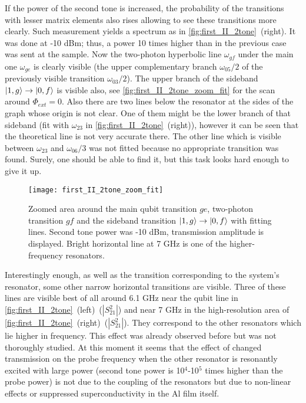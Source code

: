 \documentclass[12pt, twoside]{report}
\DeclarePairedDelimiter\ket{\lvert}{\rangle}
\numberwithin{equation}{section}
\begin{document}
If the power of the second tone is increased, the probability of the transitions with lesser matrix elements also rises allowing to see these transitions more clearly. Such measurement yields a spectrum as in \autoref{fig:first_II_2tone}~(right). It was done at -10 dBm; thus, a power 10 times higher than in the previous case was sent at the sample. Now the two-photon hyperbolic line $\omega_{gf}$ under the main one $\omega_{ge}$ is clearly visible (the upper complementary branch $\omega_{05}/2$ of the previously visible transition $\omega_{03}/2$). The upper branch of the sideband $\ket{1,g}\rightarrow \ket{0,f}$ is visible also, see \autoref{fig:first_II_2tone_zoom_fit} for the scan around $\Phi_{ext}=0$. Also there are two lines below the resonator at the sides of the graph whose origin is not clear. One of them might be the lower branch of that sideband (fit with $\omega_{23}$ in \autoref{fig:first_II_2tone}~(right)), however it can be seen that the theoretical line is not very accurate there. The other line which is visible between $\omega_{23}$ and $\omega_{06}/3$ was not fitted because no appropriate transition was found. Surely, one should be able to find it, but this task looks hard enough to give it up.

	
\begin{figure}[t]
\centering
\texttt{[image: first\_II\_2tone\_zoom\_fit]}
\caption{Zoomed area around the main qubit transition $ge$, two-photon transition $gf$ and the sideband transition $\ket{1,g}\rightarrow \ket{0,f}$ with fitting lines. Second tone power was -10 dBm, transmission amplitude is displayed. Bright horizontal line at 7 GHz is one of the higher-frequency resonators.}
\label{fig:first_II_2tone_zoom_fit}
\end{figure}

Interestingly enough, as well as the transition corresponding to the system's resonator, some other narrow horizontal transitions are visible. Three of these lines are visible best of all around 6.1 GHz near the qubit line in \autoref{fig:first_II_2tone}~(left)~($|S^2_{21}|$) and near 7 GHz in the high-resolution area of \autoref{fig:first_II_2tone}~(right)~($|S^2_{21}|$). They correspond to the other resonators which lie higher in frequency. This effect was already observed before but was not thoroughly studied. At this moment it seems that the effect of changed transmission on the probe frequency when the other resonator is resonantly excited with large power (second tone power is 10$^4$-10$^5$ times higher than the probe power) is not due to the coupling of the resonators but due to non-linear effects or suppressed superconductivity in the Al film itself.
\end{document}
